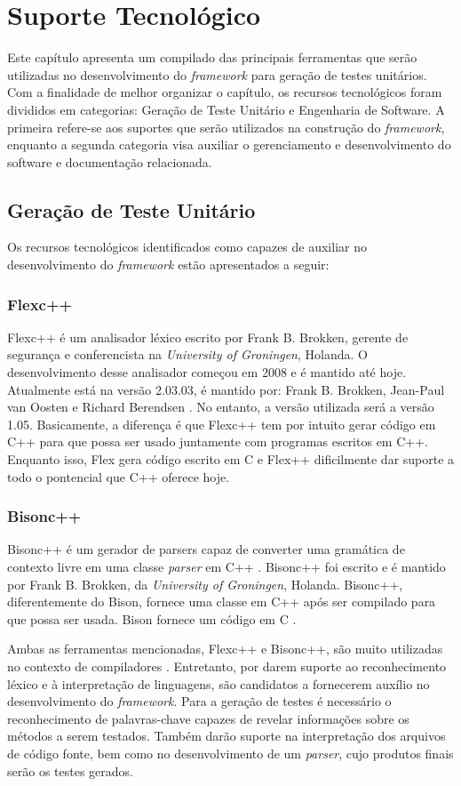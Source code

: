 \chapter[Suporte Tecnológico]{Suporte Tecnológico}
Este capítulo apresenta um compilado das principais ferramentas que serão utilizadas no desenvolvimento do \textit{framework} para geração de testes unitários. Com a finalidade de melhor organizar o capítulo, os recursos tecnológicos foram divididos em categorias: Geração de Teste Unitário e Engenharia de Software. A primeira refere-se aos suportes que serão utilizados na construção do \textit{framework}, enquanto a segunda categoria visa auxiliar o gerenciamento e desenvolvimento do software e documentação relacionada.

\section{Geração de Teste Unitário} \label{suporteGeracao}
Os recursos tecnológicos identificados como capazes de auxiliar no desenvolvimento do \textit{framework} estão apresentados a seguir:

\subsection{Flexc++}
Flexc++ é um analisador léxico escrito por Frank B. Brokken, gerente de segurança e conferencista na \textit{University of Groningen}, Holanda\cite{flexcpp2015}. O desenvolvimento desse analisador começou em 2008 e é mantido até hoje. Atualmente está na versão 2.03.03, é mantido por: Frank B. Brokken, Jean-Paul van Oosten e Richard Berendsen \cite{flexcpp2015}. No entanto, a versão utilizada será a versão 1.05. Basicamente, a diferença é que Flexc++ tem por intuito gerar código em C++ para que possa ser usado juntamente com programas escritos em C++. Enquanto isso, Flex gera código escrito em C e Flex++ dificilmente dar suporte a todo o pontencial que C++ oferece hoje.

\subsection{Bisonc++}
Bisonc++ é um gerador de parsers capaz de converter uma gramática de contexto livre em uma classe \textit{parser} em C++ \cite{bisoncpp2015}. Bisonc++ foi escrito e é mantido por Frank B. Brokken, da \textit{University of Groningen}, Holanda. Bisonc++, diferentemente do Bison, fornece uma classe em C++ após ser compilado para que possa ser usada. Bison fornece um código em C \cite{bisoncpp2015}.
\par
\indent Ambas as ferramentas mencionadas, Flexc++ e Bisonc++, são muito utilizadas no contexto de compiladores \cite{aaby2004}. Entretanto, por darem suporte ao reconhecimento léxico e à interpretação de linguagens, são candidatos a fornecerem auxílio no desenvolvimento do \textit{framework}. Para a geração de testes é necessário o reconhecimento de palavras-chave capazes de revelar informações sobre os métodos a serem testados. Também darão suporte na interpretação dos arquivos de código fonte, bem como no desenvolvimento de um \textit{parser}, cujo produtos finais serão os testes gerados.

